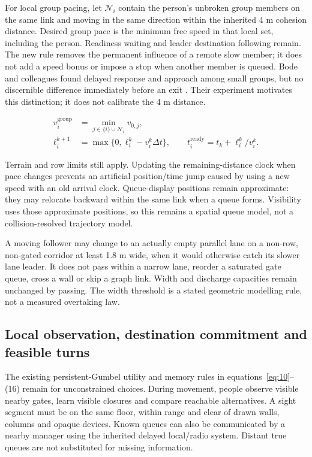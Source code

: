 \documentclass[11pt,a4paper]{article}
\begin{document}
For local group pacing, let $\mathcal N_i$ contain the person's unbroken group members on the same link and moving in the same direction within the inherited 4 m cohesion distance. Desired group pace is the minimum free speed in that local set, including the person. Readiness waiting and leader destination following remain. The new rule removes the permanent influence of a remote slow member; it does not add a speed bonus or impose a stop when another member is queued. Bode and colleagues found delayed response and approach among small groups, but no discernible difference immediately before an exit \cite{R23}. Their experiment motivates this distinction; it does not calibrate the 4 m distance.


\begin{equation}
\begin{aligned}
 v_i^{\mathrm{group}}&=\min_{j\in\{i\}\cup\mathcal N_i}v_{0,j},\\
 \ell_i^{k+1}&=\max\{0,\ell_i^k-v_i^k\Delta t\},\qquad
 t_i^{\mathrm{ready}}=t_k+\ell_i^k/v_i^k.
\end{aligned}\tag{28}\label{eq:28}
\end{equation}

Terrain and row limits still apply. Updating the remaining-distance clock when pace changes prevents an artificial position/time jump caused by using a new speed with an old arrival clock. Queue-display positions remain approximate: they may relocate backward within the same link when a queue forms. Visibility uses those approximate positions, so this remains a spatial queue model, not a collision-resolved trajectory model.


A moving follower may change to an actually empty parallel lane on a non-row, non-gated corridor at least 1.8 m wide, when it would otherwise catch its slower lane leader. It does not pass within a narrow lane, reorder a saturated gate queue, cross a wall or skip a graph link. Width and discharge capacities remain unchanged by passing. The width threshold is a stated geometric modelling rule, not a measured overtaking law.


\subsection{Local observation, destination commitment and feasible turns}

The existing persistent-Gumbel utility and memory rules in equations~\eqref{eq:10}–(16) remain for unconstrained choices. During movement, people observe visible nearby gates, learn visible closures and compare reachable alternatives. A sight segment must be on the same floor, within range and clear of drawn walls, columns and opaque devices. Known queues can also be communicated by a nearby manager using the inherited delayed local/radio system. Distant true queues are not substituted for missing information.
\end{document}
